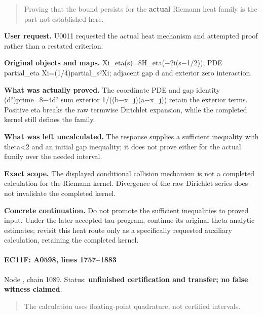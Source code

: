 \begin{quote}
Proving that the bound persists for the \textbf{actual} Riemann heat
family is the part not established here.
\end{quote}

\textbf{User request.} U0011 requested the actual heat mechanism and
attempted proof rather than a restated criterion.

\textbf{Original objects and maps.}
Xi\_eta(s)=8H\_eta(\allowbreak{}\ensuremath{−}\allowbreak{}2i(s\allowbreak{}\ensuremath{−}\allowbreak{}1/2)),
PDE partial\_eta Xi=(1/4)partial\_s²Xi; adjacent gap d and exterior zero
interaction.

\textbf{What was actually proved.} The coordinate PDE and gap identity
(d²)prime=8\allowbreak{}\ensuremath{−}\allowbreak{}4d² sum exterior
1/((b\allowbreak{}\ensuremath{−}\allowbreak{}x\_j)(a\allowbreak{}\ensuremath{−}\allowbreak{}x\_j))
retain the exterior terms. Positive eta breaks the raw termwise
Dirichlet expansion, while the completed kernel still defines the
family.

\textbf{What was left uncalculated.} The response supplies a sufficient
inequality with theta\textless2 and an initial gap inequality; it does
not prove either for the actual family over the needed interval.

\textbf{Exact scope.} The displayed conditional collision mechanism is
not a completed calculation for the Riemann kernel. Divergence of the
raw Dirichlet series does not invalidate the completed kernel.

\textbf{Concrete continuation.} Do not promote the sufficient
inequalities to proved input. Under the later accepted tau program,
continue its original theta analytic estimates; revisit this heat route
only as a specifically requested auxiliary calculation, retaining the
completed kernel.

\paragraph{EC11F: A0598, lines
1757--1883}\label{ec11f-a0598-lines-17571883}

Node \protect{}, chain 1089.
Status: \textbf{unfinished certification and transfer; no false witness
claimed}.

\begin{quote}
The calculation uses floating-point quadrature, not certified intervals.
\end{quote}


